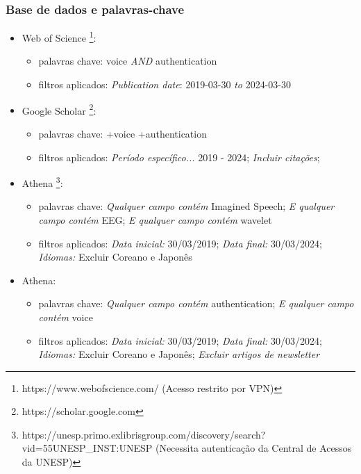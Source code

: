 			\subsubsection{Base de dados e palavras-chave}
			\label{sec:baseEPalavras}
			\begin{itemize}
				\item Web of Science \footnote{https://www.webofscience.com/ (Acesso restrito por VPN)}:
				\begin{itemize}
					\item palavras chave: voice \textit{AND} authentication
					\item filtros aplicados: \textit{Publication date}: 2019-03-30 \textit{to} 2024-03-30
				\end{itemize}
				
				\item Google Scholar \footnote{https://scholar.google.com}:
				\begin{itemize}
					\item palavras chave: +voice +authentication
					\item filtros aplicados: \textit{Período específico...} 2019 - 2024; \textit{Incluir citações};
				\end{itemize}
				\item Athena \footnote{https://unesp.primo.exlibrisgroup.com/discovery/search?vid=55UNESP\_INST:UNESP (Necessita autenticação da Central de Acessos da UNESP)}:
				\begin{itemize}
					\item palavras chave: \textit{Qualquer campo contém} Imagined Speech; \textit{E qualquer campo contém} EEG; \textit{E qualquer campo contém} wavelet
					\item filtros aplicados: \textit{Data inicial:} 30/03/2019; \textit{Data final:} 30/03/2024; \textit{Idiomas:} Excluir Coreano e Japonês
				\end{itemize}
				\item Athena:
				\begin{itemize}
					\item palavras chave: \textit{Qualquer campo contém} authentication; \textit{E qualquer campo contém} voice
					\item filtros aplicados: \textit{Data inicial:} 30/03/2019; \textit{Data final:} 30/03/2024; \textit{Idiomas:} Excluir Coreano e Japonês; \textit{Excluir artigos de newsletter}
				\end{itemize}
			\end{itemize}
		
